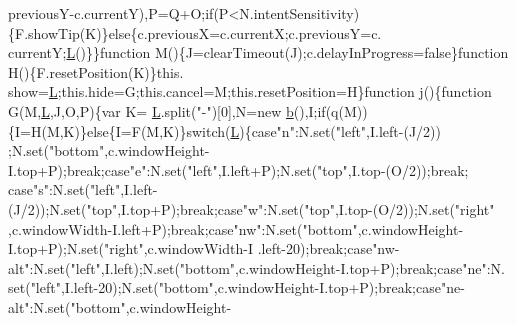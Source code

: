 \begin{DoxyCode}
      previousY-c.currentY),P=Q+O;\textcolor{keywordflow}{if}(P<N.intentSensitivity)\{F.showTip(K)\}\textcolor{keywordflow}{else}\{c.previousX=c.currentX;c.previousY=c.
      currentY;\hyperlink{jquery_8js_a38ee4c0b5f4fe2a18d0c783af540d253}{L}()\}\}\textcolor{keyword}{function} M()\{J=clearTimeout(J);c.delayInProgress=\textcolor{keyword}{false}\}\textcolor{keyword}{function} H()\{F.resetPosition(K)\}this.
      show=\hyperlink{jquery_8js_a38ee4c0b5f4fe2a18d0c783af540d253}{L};this.hide=G;this.cancel=M;this.resetPosition=H\}\textcolor{keyword}{function} j()\{\textcolor{keyword}{function} G(M,\hyperlink{jquery_8js_a38ee4c0b5f4fe2a18d0c783af540d253}{L},J,O,P)\{var K=
      \hyperlink{jquery_8js_a38ee4c0b5f4fe2a18d0c783af540d253}{L}.split(\textcolor{stringliteral}{"-"})[0],N=\textcolor{keyword}{new} \hyperlink{jquery_8js_aa4026ad5544b958e54ce5e106fa1c805}{b}(),I;\textcolor{keywordflow}{if}(q(M))\{I=H(M,K)\}\textcolor{keywordflow}{else}\{I=F(M,K)\}\textcolor{keywordflow}{switch}(\hyperlink{jquery_8js_a38ee4c0b5f4fe2a18d0c783af540d253}{L})\{\textcolor{keywordflow}{case}\textcolor{stringliteral}{"n"}:N.set(\textcolor{stringliteral}{"left"},I.left-(J/2))
      ;N.set(\textcolor{stringliteral}{"bottom"},c.windowHeight-I.top+P);\textcolor{keywordflow}{break};\textcolor{keywordflow}{case}\textcolor{stringliteral}{"e"}:N.set(\textcolor{stringliteral}{"left"},I.left+P);N.set(\textcolor{stringliteral}{"top"},I.top-(O/2));\textcolor{keywordflow}{break};\textcolor{keywordflow}{
      case}\textcolor{stringliteral}{"s"}:N.set(\textcolor{stringliteral}{"left"},I.left-(J/2));N.set(\textcolor{stringliteral}{"top"},I.top+P);\textcolor{keywordflow}{break};\textcolor{keywordflow}{case}\textcolor{stringliteral}{"w"}:N.set(\textcolor{stringliteral}{"top"},I.top-(O/2));N.set(\textcolor{stringliteral}{"right"}
      ,c.windowWidth-I.left+P);\textcolor{keywordflow}{break};\textcolor{keywordflow}{case}\textcolor{stringliteral}{"nw"}:N.set(\textcolor{stringliteral}{"bottom"},c.windowHeight-I.top+P);N.set(\textcolor{stringliteral}{"right"},c.windowWidth-I
      .left-20);\textcolor{keywordflow}{break};\textcolor{keywordflow}{case}\textcolor{stringliteral}{"nw-alt"}:N.set(\textcolor{stringliteral}{"left"},I.left);N.set(\textcolor{stringliteral}{"bottom"},c.windowHeight-I.top+P);\textcolor{keywordflow}{break};\textcolor{keywordflow}{case}\textcolor{stringliteral}{"ne"}:N.
      set(\textcolor{stringliteral}{"left"},I.left-20);N.set(\textcolor{stringliteral}{"bottom"},c.windowHeight-I.top+P);\textcolor{keywordflow}{break};\textcolor{keywordflow}{case}\textcolor{stringliteral}{"ne-alt"}:N.set(\textcolor{stringliteral}{"bottom"},c.windowHeight-

\end{DoxyCode}
